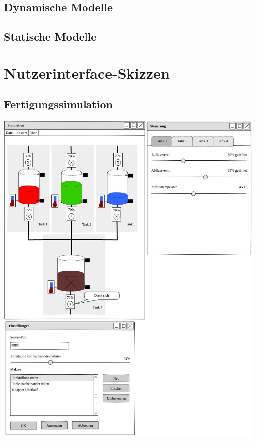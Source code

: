 \documentclass[parskip=full]{scrartcl}
\begin{document}
\subsection{Dynamische Modelle}
\Blindtext[1]

\subsection{Statische Modelle}
\Blindtext[1]

\section{Nutzerinterface-Skizzen}
\subsection{Fertigungssimulation}
\includegraphics[scale=0.5]{media/ui-sketch-server.png}

\pagebreak
\printglossaries
\end{document}
